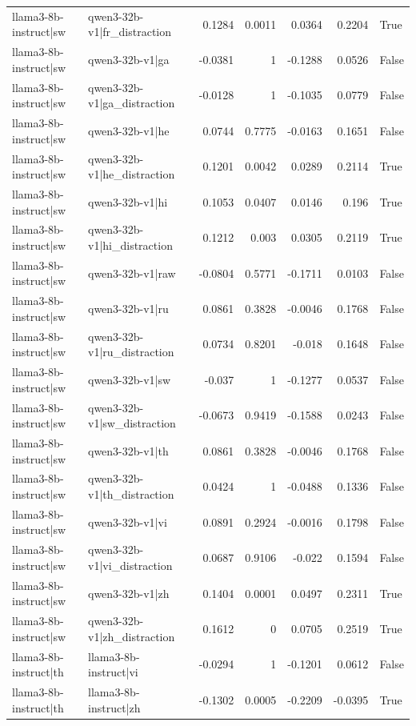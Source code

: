 \begin{table}
\begin{tabular}{l l r r r r l}
llama3-8b-instruct|sw & qwen3-32b-v1|fr_distraction & 0.1284 & 0.0011 & 0.0364 & 0.2204 & True \\
llama3-8b-instruct|sw & qwen3-32b-v1|ga & -0.0381 & 1 & -0.1288 & 0.0526 & False \\
llama3-8b-instruct|sw & qwen3-32b-v1|ga_distraction & -0.0128 & 1 & -0.1035 & 0.0779 & False \\
llama3-8b-instruct|sw & qwen3-32b-v1|he & 0.0744 & 0.7775 & -0.0163 & 0.1651 & False \\
llama3-8b-instruct|sw & qwen3-32b-v1|he_distraction & 0.1201 & 0.0042 & 0.0289 & 0.2114 & True \\
llama3-8b-instruct|sw & qwen3-32b-v1|hi & 0.1053 & 0.0407 & 0.0146 & 0.196 & True \\
llama3-8b-instruct|sw & qwen3-32b-v1|hi_distraction & 0.1212 & 0.003 & 0.0305 & 0.2119 & True \\
llama3-8b-instruct|sw & qwen3-32b-v1|raw & -0.0804 & 0.5771 & -0.1711 & 0.0103 & False \\
llama3-8b-instruct|sw & qwen3-32b-v1|ru & 0.0861 & 0.3828 & -0.0046 & 0.1768 & False \\
llama3-8b-instruct|sw & qwen3-32b-v1|ru_distraction & 0.0734 & 0.8201 & -0.018 & 0.1648 & False \\
llama3-8b-instruct|sw & qwen3-32b-v1|sw & -0.037 & 1 & -0.1277 & 0.0537 & False \\
llama3-8b-instruct|sw & qwen3-32b-v1|sw_distraction & -0.0673 & 0.9419 & -0.1588 & 0.0243 & False \\
llama3-8b-instruct|sw & qwen3-32b-v1|th & 0.0861 & 0.3828 & -0.0046 & 0.1768 & False \\
llama3-8b-instruct|sw & qwen3-32b-v1|th_distraction & 0.0424 & 1 & -0.0488 & 0.1336 & False \\
llama3-8b-instruct|sw & qwen3-32b-v1|vi & 0.0891 & 0.2924 & -0.0016 & 0.1798 & False \\
llama3-8b-instruct|sw & qwen3-32b-v1|vi_distraction & 0.0687 & 0.9106 & -0.022 & 0.1594 & False \\
llama3-8b-instruct|sw & qwen3-32b-v1|zh & 0.1404 & 0.0001 & 0.0497 & 0.2311 & True \\
llama3-8b-instruct|sw & qwen3-32b-v1|zh_distraction & 0.1612 & 0 & 0.0705 & 0.2519 & True \\
llama3-8b-instruct|th & llama3-8b-instruct|vi & -0.0294 & 1 & -0.1201 & 0.0612 & False \\
llama3-8b-instruct|th & llama3-8b-instruct|zh & -0.1302 & 0.0005 & -0.2209 & -0.0395 & True \\

\end{tabular}
\end{table}

